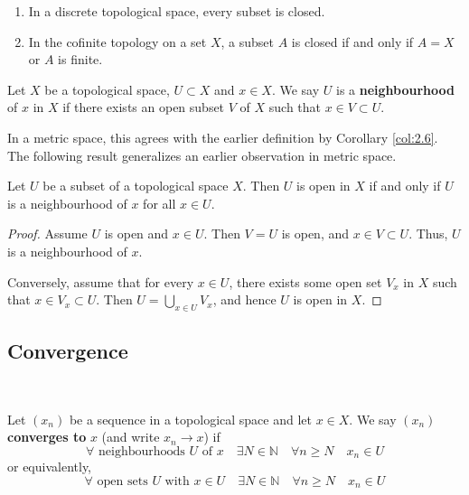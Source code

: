 \documentclass[a4paper,11pt]{article}
\begin{document}
\begin{example}
    \begin{enumerate}
        \item In a discrete topological space, every subset is closed.
      
        \item In the cofinite topology on a set $X$, a subset $A$ is closed if and only if $A=X$ or $A$ is finite.
      
      \end{enumerate}
\end{example}

\begin{definition}
    Let $X$ be a topological space, $U \subset X$ and $x \in X$. We say $U$ is a \textbf{neighbourhood} of $x$ in $X$ if there exists an open subset $V$ of $X$ such that $x \in V \subset U$.
\end{definition}

\begin{note}
    In a metric space, this agrees with the earlier definition by Corollary \ref{col:2.6}. The following result generalizes an earlier observation in metric space.
\end{note}

\begin{proposition}
    Let $U$ be a subset of a topological space $X$. Then $U$ is open in $X$ if and only if $U$ is a neighbourhood of $x$ for all $x \in U$.
\end{proposition}

\begin{proof}
    Assume $U$ is open and $x \in U$. Then $V=U$ is open, and $x \in V \subset U$. Thus, $U$ is a neighbourhood of $x$.

    Conversely, assume that for every $x \in U$, there exists some open set $V_{x}$ in $X$ such that $x \in V_{x} \subset U$. Then $U=\bigcup_{x \in U} V_{x}$, and hence $U$ is open in $X$.
\end{proof}

\subsection{Convergence}\ \vspace{-1.5em}
\begin{definition}
    Let $\left(x_{n}\right)$ be a sequence in a topological space and let $x \in X$. We say $\left(x_{n}\right)$ \textbf{converges to} $x$ (and write $x_{n} \rightarrow x$) if
    $$
    \forall \text { neighbourhoods } U \text { of } x \quad \exists N \in \mathbb{N} \quad \forall n \geqslant N \quad x_{n} \in U
    $$
    or equivalently,
    $$
    \forall \text { open sets } U \text { with } x \in U \quad \exists N \in \mathbb{N} \quad \forall n \geqslant N \quad x_{n} \in U
    $$
\end{definition}
\end{document}
